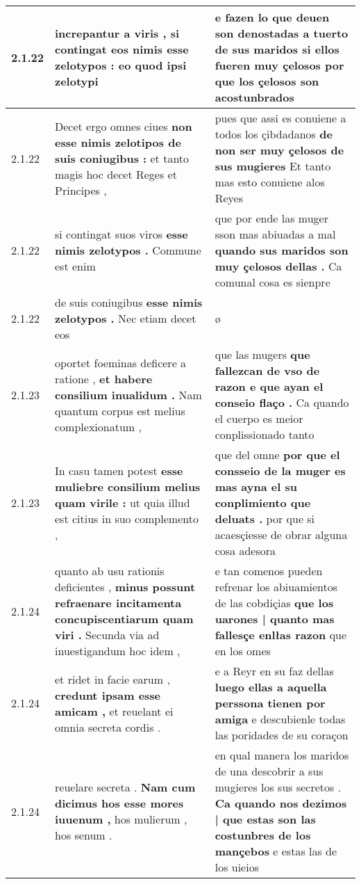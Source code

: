 \begin{tabular}{|p{1cm}|p{6.5cm}|p{6.5cm}|}
2.1.22 & increpantur a viris , \textbf{ si contingat eos nimis esse zelotypos : } eo quod ipsi zelotypi & e fazen lo que deuen son denostadas a tuerto de sus maridos \textbf{ si ellos fueren muy çelosos } por que los çelosos son acostunbrados \\\hline
2.1.22 & Decet ergo omnes ciues \textbf{ non esse nimis zelotipos de suis coniugibus : } et tanto magis hoc decet Reges et Principes , & pues que assi es conuiene a todos los çibdadanos \textbf{ de non ser muy çelosos de sus mugieres } Et tanto mas esto conuiene alos Reyes \\\hline
2.1.22 & si contingat suos viros \textbf{ esse nimis zelotypos . } Commune est enim & que por ende las muger sson mas abiuadas a mal \textbf{ quando sus maridos son muy çelosos dellas . } Ca comunal cosa es sienpre \\\hline
2.1.22 & de suis coniugibus \textbf{ esse nimis zelotypos . } Nec etiam decet eos & ø \\\hline
2.1.23 & oportet foeminas deficere a ratione , \textbf{ et habere consilium inualidum . } Nam quantum corpus est melius complexionatum , & que las mugers \textbf{ que fallezcan de vso de razon e que ayan el conseio flaço . } Ca quando el cuerpo es meior conplissionado tanto \\\hline
2.1.23 & In casu tamen potest \textbf{ esse muliebre consilium melius quam virile : } ut quia illud est citius in suo complemento , & que del omne \textbf{ por que el consseio de la muger es mas ayna el su conplimiento que deluats . } por que si acaesçiesse de obrar alguna cosa adesora \\\hline
2.1.24 & quanto ab usu rationis deficientes , \textbf{ minus possunt refraenare incitamenta concupiscentiarum quam viri . } Secunda via ad inuestigandum hoc idem , & e tan comenos pueden refrenar los abiuamientos de las cobdiçias \textbf{ que los uarones | quanto mas fallesçe enlłas razon } que en los omes \\\hline
2.1.24 & et ridet in facie earum , \textbf{ credunt ipsam esse amicam , } et reuelant ei omnia secreta cordis . & e a Reyr en su faz dellas \textbf{ luego ellas a aquella perssona tienen por amiga } e descubienle todas las poridades de su coraçon \\\hline
2.1.24 & reuelare secreta . \textbf{ Nam cum dicimus hos esse mores iuuenum , } hos mulierum , hos senum . & en qual manera los maridos de una descobrir a sus mugieres los sus secretos . \textbf{ Ca quando nos dezimos | que estas son las costunbres de los mançebos } e estas las de los uieios \\\hline

\end{tabular}
